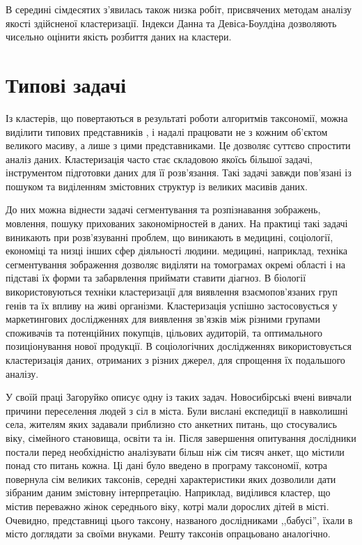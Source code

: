     В середині сімдесятих з'явилась також низка робіт, присвячених методам аналізу якості здійсненої кластеризації. Індекси Данна \cite{Dunn} та  Девіса-Боулдіна \cite{DavisBouldin} дозволяють чисельно оцінити якість розбиття даних на кластери.

\section{Типові задачі}
    Із кластерів, що повертаються в результаті роботи алгоритмів таксономії, можна виділити типових представників , і надалі працювати не з кожним об'єктом великого масиву, а лише з цими представниками. Це дозволяє суттєво спростити аналіз даних. Кластеризація часто стає складовою якоїсь більшої задачі, інструментом підготовки даних для її розв'язання. Такі задачі завжди пов'язані із пошуком та виділенням змістовних структур із великих масивів даних. 

    До них можна віднести задачі сегментування та розпізнавання зображень, мовлення, пошуку прихованих закономірностей в даних. На практиці такі задачі виникають при розв'язуванні проблем, що виникають в медицині, соціології, економіці та низці інших сфер діяльності людини. 
     медицині, наприклад, техніка сегментування зображення дозволяє виділяти на томограмах окремі області і на підставі їх форми та забарвлення приймати ставити діагноз. 
    В біології використовуються техніки кластеризації для виявлення взаємопов'язаних груп генів та їх впливу на живі організми. 
    Кластеризація успішно застосовується у маркетингових дослідженнях для виявлення зв'язків між різними групами споживачів та потенційних покупців, цільових аудиторій, та оптимального позиціонування нової продукції. 
    В соціологічних дослідженнях використовується кластеризація даних, отриманих з різних джерел, для спрощення їх подальшого аналізу. 

    У своїй праці \cite{Zagorujko} Загоруйко описує одну із таких задач. Новосибірські вчені вивчали причини переселення людей з сіл в міста. Були вислані експедиції в навколишні села, жителям яких задавали приблизно сто анкетних питань, що стосувались віку, сімейного становища, освіти та ін. Після завершення опитування дослідники постали перед необхідністю аналізувати більш ніж сім тисяч анкет, що містили понад сто питань кожна. 
    Ці дані було введено в програму таксономії, котра повернула сім великих таксонів, середні характеристики яких дозволили дати зібраним даним змістовну інтерпретацію. Наприклад, виділився кластер, що містив переважно жінок середнього віку, котрі мали дорослих дітей в місті. Очевидно, представниці цього таксону, названого дослідниками ,,бабусі'', їхали в місто доглядати за своїми внуками. Решту таксонів опрацьовано аналогічно.
    
